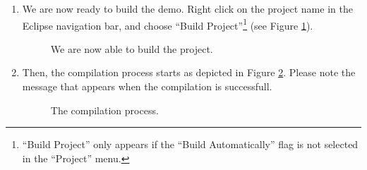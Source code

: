 \begin{enumerate}
\item
  We are now ready to build the demo. Right click on the project name
  in the Eclipse navigation bar, and choose ``Build
  Project''\footnote{``Build Project'' only appears if the ``Build
  Automatically'' flag is not selected in the ``Project'' menu.} (see
  Figure \ref{fig:build-project}).
%
\begin{figure}[htb]
\caption{We are now able to build the project.}
\label{fig:build-project}
\end{figure}

\item
  Then, the compilation process starts as depicted in Figure
  \ref{fig:compiling}. Please note the message that appears when the
  compilation is successfull.
%
\begin{figure}[htb]
\caption{The compilation process.}
\label{fig:compiling}
\end{figure}


\end{enumerate}
